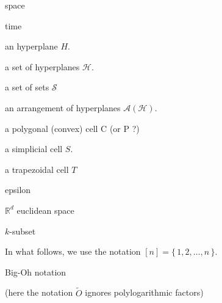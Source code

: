 
space

time

an hyperplane \(H\).

a set of hyperplanes \(\mathcal{H}\).

a set of sets \(\mathcal{S}\)

an arrangement of hyperplanes \(\mathcal{A}(\mathcal{H})\).

a polygonal (convex) cell C (or P ?)

a simplicial cell \(S\).

a trapezoidal cell \(T\)

epsilon

\(\mathbb{R}^d\) euclidean space

\(k\)-subset

In what follows, we use the notation \([n] = \{\,1,2,\ldots ,n\,\}\).

Big-Oh notation

(here the notation $\tilde{O}$ ignores polylogarithmic
factors)
